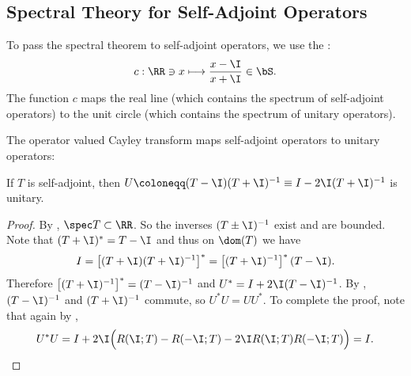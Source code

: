 \documentclass[oneside,reqno,letterpaper]{amsart}
\begin{document}
\subsection{Spectral Theory for Self-Adjoint Operators}
To pass the spectral theorem to self-adjoint operators, we use the :
\[
  c: \RR \ni x \longmapsto \frac{x - \I}{x + \I} \in \bS . 
\] 
The function \(c\) maps the real line (which contains the spectrum of self-adjoint operators) to the unit circle (which contains the spectrum of unitary operators).

The operator valued Cayley transform maps self-adjoint operators to unitary operators:

\begin{lemma}
  If \(T\) is self-adjoint, then \(U \coloneqq (T - \I)(T + \I)^{-1} \equiv  I - 2\I (T + \I)^{-1}\) is unitary. 
\end{lemma}
\begin{proof}
  By , \(\spec T \subset \RR\). 
  So the inverses \((T \pm \I)^{-1}\) exist and are bounded. 
  Note that \((T + \I)^* = T - \I\) and thus on \(\dom(T)\) we have 
  \[
    I
    = \left[ (T + \I)(T + \I)^{-1} \right]^*
    = \left[ (T + \I)^{-1} \right]^* (T - \I) . 
  \] 
  Therefore \(\left[ (T + \I)^{-1} \right]^* = (T - \I)^{-1}\) and \(U^* = I + 2\I (T - \I)^{-1}\). 
  By , \((T - \I)^{-1}\) and \((T + \I)^{-1}\) commute, so \(U^*U = U U^*\). 
  To complete the proof, note that again by , 
  \[
    U^*U = I + 2\I \Big( R(\I; T) - R(-\I; T) - 2\I R(\I; T) R(-\I; T) \Big) = I . 
  \] 
\end{proof}
\end{document}
